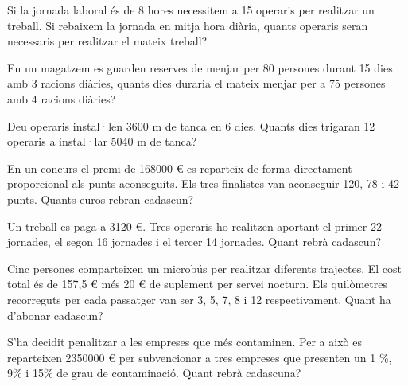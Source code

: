 \begin{activitats}
\begin{mylist}

\exer
  Si la jornada laboral és de 8 hores necessitem a 15 operaris per
  realitzar un treball. Si rebaixem la jornada en mitja hora diària,
  quants operaris seran necessaris per realitzar el mateix treball?
  
  
  
\exer
  En un magatzem es guarden reserves de menjar per 80 persones durant 15
  dies amb 3 racions diàries, quants dies duraria el mateix menjar per a
  75 persones amb 4 racions diàries?



\exer
  Deu operaris instal·len 3600 m de tanca en 6 dies. Quants dies
  trigaran 12 operaris a instal·lar 5040 m de tanca?



\exer
  En un concurs el premi de 168000 \euro{} es reparteix de forma
  directament proporcional als punts aconseguits. Els tres finalistes
  van aconseguir 120, 78 i 42 punts. Quants euros rebran cadascun?
\answers{84000 \euro{}; 54600 \euro{}; 29400 \euro{}}



\exer
  Un treball es paga a 3120 \euro{}. Tres operaris ho realitzen aportant
  el primer 22 jornades, el segon 16 jornades i el tercer 14 jornades.
  Quant rebrà cadascun?
\answers{1320 \euro{}; 960 \euro{}; 840 \euro{}}


\exer
  Cinc persones comparteixen un microbús per realitzar diferents
  trajectes. El cost total és de 157,5 \euro{} més 20 \euro{} de
  suplement per servei nocturn. Els quilòmetres recorreguts per cada
  passatger van ser 3, 5, 7, 8 i 12 respectivament. Quant ha d'abonar
  cadascun?


\exer
  S'ha decidit penalitzar a les empreses que més contaminen. Per a això
  es reparteixen 2350000 \euro{} per subvencionar a tres empreses que
  presenten un 1 \%, 9\% i 15\% de grau de contaminació. Quant rebrà
  cadascuna?



\end{mylist}
\end{activitats}
